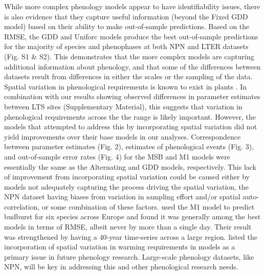 \documentclass[fleqn,12pt,lineno]{wlpeerj} %
\begin{document}
While more complex phenology models appear to have identifiability issues, there is also evidence that they capture useful information (beyond the Fixed GDD model) based on their ability to make out-of-sample predictions. Based on the RMSE, the GDD and Uniforc models produce the best out-of-sample predictions for the majority of species and phenophases at both NPN and LTER datasets (Fig. S1 \& S2). This demonstrates that the more complex models are capturing additional information about phenology, and that some of the differences between datasets result from differences in either the scales or the sampling of the data. Spatial variation in phenological requirements is known to exist in plants \citep{zhang2017}. In combination with our results showing observed differences in parameter estimates between LTS sites (Supplementary Material), this suggests that variation in phenological requirements across the the range is likely important. However, the models that attempted to address this by incorporating spatial variation did not yield improvements over their base models in our analyses. Correspondence between parameter estimates (Fig. 2), estimates of phenological events (Fig. 3), and out-of-sample error rates (Fig. 4) for the MSB and M1 models were essentially the same as the Alternating and GDD models, respectively. This lack of improvement from incorporating spatial variation could be caused either by models not adequately capturing the process driving the spatial variation, the NPN dataset having biases from variation in sampling effort and/or spatial auto-correlation, or some combination of these factors. \cite{basler2016} used the M1 model to predict budburst for six species across Europe and found it was generally among the best models in terms of RMSE, albeit never by more than a single day. Their result was strengthened by having a 40-year time-series across a large region. \cite{chuine2017} listed the incorporation of spatial variation in warming requirements in models as a primary issue in future phenology research. Large-scale phenology datasets, like NPN, will be key in addressing this and other phenological research needs.
\end{document}
